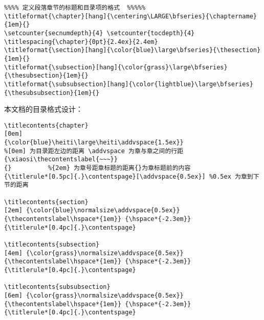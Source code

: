 \scriptsize
\begin{lstlisting}
%%%% 定义段落章节的标题和目录项的格式  %%%%%
\titleformat{\chapter}[hang]{\centering\LARGE\bfseries}{\chaptername}{1em}{}
\setcounter{secnumdepth}{4} \setcounter{tocdepth}{4}
\titlespacing{\chapter}{0pt}{2.4ex}{2.4em}
\titleformat{\section}[hang]{\color{blue}\large\bfseries}{\thesection}{1em}{}
\titleformat{\subsection}[hang]{\color{grass}\large\bfseries}{\thesubsection}{1em}{}
\titleformat{\subsubsection}[hang]{\color{lightblue}\large\bfseries}{\thesubsubsection}{1em}{}
\end{lstlisting}
\normalsize
{}
本文档的目录格式设计：
\scriptsize
\begin{lstlisting}
\titlecontents{chapter}
[0em]
{\color{blue}\heiti\large\heiti\addvspace{1.5ex}}
%[0em] 为目录距左边的距离 \addvspace 为章与章之间的行距
{\xiaosi\thecontentslabel{~~~}}
{}          %{2em} 为章号距章标题的距离{}为章标题前的内容
{\titlerule*[0.5pc]{.}\contentspage}[\addvspace{0.5ex}] %0.5ex 为章到下节的距离

\titlecontents{section}
[2em] {\color{blue}\normalsize\addvspace{0.5ex}}
{\thecontentslabel\hspace*{1em}} {\hspace*{-2.3em}}
{\titlerule*[0.4pc]{.}\contentspage}

\titlecontents{subsection}
[4em] {\color{grass}\normalsize\addvspace{0.5ex}}
{\thecontentslabel\hspace*{1em}} {\hspace*{-2.3em}}
{\titlerule*[0.4pc]{.}\contentspage}

\titlecontents{subsubsection}
[6em] {\color{grass}\normalsize\addvspace{0.5ex}}
{\thecontentslabel\hspace*{1em}} {\hspace*{-2.3em}}
{\titlerule*[0.4pc]{.}\contentspage}
\end{lstlisting}
\normalsize

